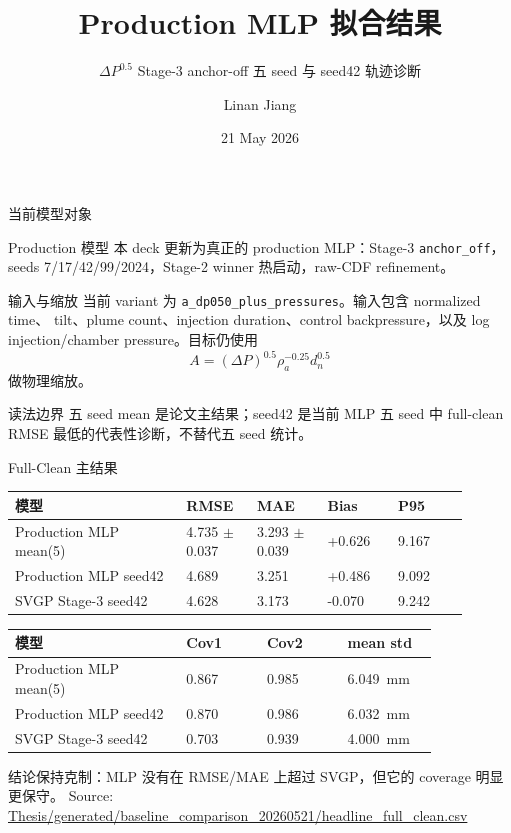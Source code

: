 \documentclass[aspectratio=169,11pt]{beamer}
\title[NN Fitting Results]{Production MLP 拟合结果}
\subtitle{\(\Delta P^{0.5}\) Stage-3 anchor-off 五 seed 与 seed42 轨迹诊断}
\author{Linan Jiang}
\institute{Aalto University}
\date{21 May 2026}
\newcommand{\good}[1]{\textcolor{green!45!black}{#1}}
\newcommand{\blue}[1]{\textcolor{blue!65!black}{#1}}
\newcommand{\src}[1]{\vfill{\tiny\textcolor{gray!75!black}{Source: \url{#1}}}}
\begin{document}
\begin{frame}
  \titlepage
\end{frame}

\begin{frame}{当前模型对象}
\small
\begin{block}{Production 模型}
本 deck 更新为真正的 production MLP：Stage-3 \texttt{anchor\_off}，
seeds 7/17/42/99/2024，Stage-2 winner 热启动，raw-CDF refinement。
\end{block}

\begin{block}{输入与缩放}
\footnotesize
当前 variant 为 \texttt{a\_dp050\_plus\_pressures}。输入包含 normalized time、
tilt、plume count、injection duration、control backpressure，以及
log injection/chamber pressure。目标仍使用
\[
A=(\Delta P)^{0.5}\rho_a^{-0.25}d_n^{0.5}
\]
做物理缩放。
\end{block}

\begin{block}{读法边界}
\footnotesize
五 seed mean 是论文主结果；seed42 是当前 MLP 五 seed 中 full-clean RMSE
最低的代表性诊断，不替代五 seed 统计。
\end{block}
\end{frame}

\begin{frame}{Full-Clean 主结果}
\small
\begin{tabular}{L{0.34\linewidth}R{0.14\linewidth}R{0.14\linewidth}R{0.14\linewidth}R{0.14\linewidth}}
\toprule
模型 & RMSE & MAE & Bias & P95 \\
\midrule
Production MLP mean(5) & \good{4.735 \(\pm\) 0.037} & 3.293 \(\pm\) 0.039 & +0.626 & 9.167 \\
Production MLP seed42 & \good{4.689} & 3.251 & +0.486 & 9.092 \\
SVGP Stage-3 seed42 & \blue{4.628} & \blue{3.173} & -0.070 & 9.242 \\
\bottomrule
\end{tabular}

\vspace{0.7em}
\begin{tabular}{L{0.34\linewidth}R{0.16\linewidth}R{0.16\linewidth}R{0.18\linewidth}}
\toprule
模型 & Cov1 & Cov2 & mean std \\
\midrule
Production MLP mean(5) & \good{0.867} & \good{0.985} & \SI{6.049}{mm} \\
Production MLP seed42 & 0.870 & 0.986 & \SI{6.032}{mm} \\
SVGP Stage-3 seed42 & 0.703 & 0.939 & \SI{4.000}{mm} \\
\bottomrule
\end{tabular}

\vspace{0.6em}
\footnotesize
结论保持克制：MLP 没有在 RMSE/MAE 上超过 SVGP，但它的 coverage 明显更保守。
\src{Thesis/generated/baseline_comparison_20260521/headline_full_clean.csv}
\end{frame}
\end{document}

